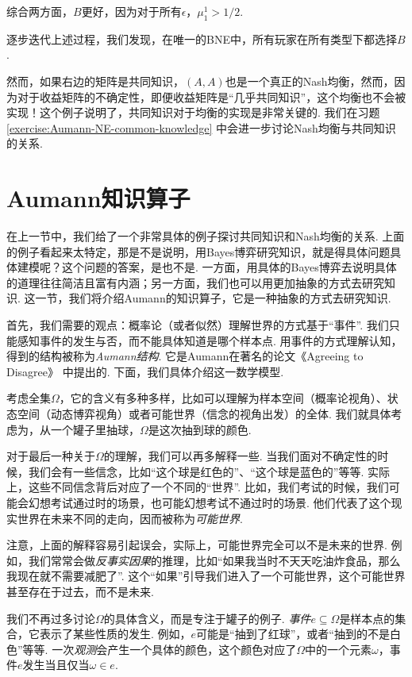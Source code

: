 综合两方面，$B$更好，因为对于所有$\epsilon$，$\mu_1^1 > 1/2$. 

逐步迭代上述过程，我们发现，在唯一的BNE中，所有玩家在所有类型下都选择$B$. 

然而，如果右边的矩阵是共同知识，$(A,A)$也是一个真正的Nash均衡，然而，因为对于收益矩阵的不确定性，即便收益矩阵是“几乎共同知识”，这个均衡也不会被实现！这个例子说明了，共同知识对于均衡的实现是非常关键的. 我们在习题 \ref{exercise:Aumann-NE-common-knowledge} 中会进一步讨论Nash均衡与共同知识的关系.

\section{Aumann知识算子}

在上一节中，我们给了一个非常具体的例子探讨共同知识和Nash均衡的关系. 上面的例子看起来太特定，那是不是说明，用Bayes博弈研究知识，就是得具体问题具体建模呢？这个问题的答案，是也不是. 一方面，用具体的Bayes博弈去说明具体的道理往往简洁且富有内涵；另一方面，我们也可以用更加抽象的方式去研究知识. 这一节，我们将介绍Aumann的知识算子，它是一种抽象的方式去研究知识.

首先，我们需要的观点：概率论（或者似然）理解世界的方式基于“事件”. 我们只能感知事件的发生与否，而不能具体知道是哪个样本点. 用事件的方式理解认知，得到的结构被称为\textit{Aumann结构}. 它是Aumann在著名的论文《Agreeing to Disagree》\cite{aumannAgreeingDisagree1976} 中提出的. 下面，我们具体介绍这一数学模型. 

考虑全集$\Omega$，它的含义有多种多样，比如可以理解为样本空间（概率论视角）、状态空间（动态博弈视角）或者可能世界（信念的视角出发）的全体. 我们就具体考虑为，从一个罐子里抽球，$\Omega$是这次抽到球的颜色. 

对于最后一种关于$\Omega$的理解，我们可以再多解释一些. 当我们面对不确定性的时候，我们会有一些信念，比如“这个球是红色的”、“这个球是蓝色的”等等. 实际上，这些不同信念背后对应了一个不同的“世界”. 比如，我们考试的时候，我们可能会幻想考试通过时的场景，也可能幻想考试不通过时的场景. 他们代表了这个现实世界在未来不同的走向，因而被称为\textit{可能世界}.

注意，上面的解释容易引起误会，实际上，可能世界完全可以不是未来的世界. 例如，我们常常会做\textit{反事实因果}的推理，比如“如果我当时不天天吃油炸食品，那么我现在就不需要减肥了”. 这个“如果”引导我们进入了一个可能世界，这个可能世界甚至存在于过去，而不是未来.

我们不再过多讨论$\Omega$的具体含义，而是专注于罐子的例子. \textit{事件}$e\subseteq \Omega$是样本点的集合，它表示了某些性质的发生. 例如，$e$可能是“抽到了红球”，或者“抽到的不是白色”等等. 一次\textit{观测}会产生一个具体的颜色，这个颜色对应了$\Omega$中的一个元素$\omega$，事件$e$发生当且仅当$\omega\in e$.


